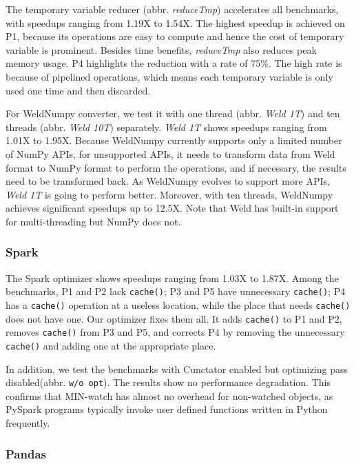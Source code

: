 \documentclass[sigconf]{acmart}\settopmatter{printfolios=true,printccs=false,printacmref=false}\setcopyright{none}
\begin{document}
The temporary variable reducer (abbr. \textit{reduceTmp}) accelerates all benchmarks, with speedups ranging from 1.19X to 1.54X. The highest speedup is achieved on P1, because its operations are easy to compute and hence the cost of temporary variable is prominent. Besides time benefits, \textit{reduceTmp} also reduces peak memory usage. P4 highlights the reduction with a rate of 75\%. The high rate is because of pipelined operations, which means each temporary variable is only used one time and then discarded.

For WeldNumpy converter, we test it with one thread (abbr. \textit{Weld 1T}) and ten threads (abbr. \textit{Weld 10T}) separately. \textit{Weld 1T} shows speedups ranging from 1.01X to 1.95X. Because WeldNumpy currently supports only a limited number of NumPy APIs, for unsupported APIs, it needs to transform data from Weld format to NumPy format to perform the operations, and if necessary, the results need to be transformed back. As WeldNumpy evolves to support more APIs, \textit{Weld 1T} is going to perform better. Moreover, with ten threads, WeldNumpy achieves significant speedups up to 12.5X. Note that Weld has built-in support for multi-threading but NumPy does not.

\subsubsection{Spark}

The Spark optimizer shows speedups ranging from 1.03X to 1.87X. Among the benchmarks, P1 and P2 lack \texttt{cache()}; P3 and P5 have unnecessary \texttt{cache()}; P4 has a \texttt{cache()} operation at a useless location, while the place that needs \texttt{cache()} does not have one. Our optimizer fixes them all. It adds \texttt{cache()} to P1 and P2, removes \texttt{cache()} from P3 and P5, and corrects P4 by removing the unnecessary \texttt{cache()} and adding one at the appropriate place.

In addition, we test the benchmarks with Cunctator enabled but optimizing pass disabled(abbr. \texttt{w/o opt}). The results show no performance degradation. This confirms that MIN-watch has almost no overhead for non-watched objects, as PySpark programs typically invoke user defined functions written in Python frequently.

\subsubsection{Pandas}
\end{document}
